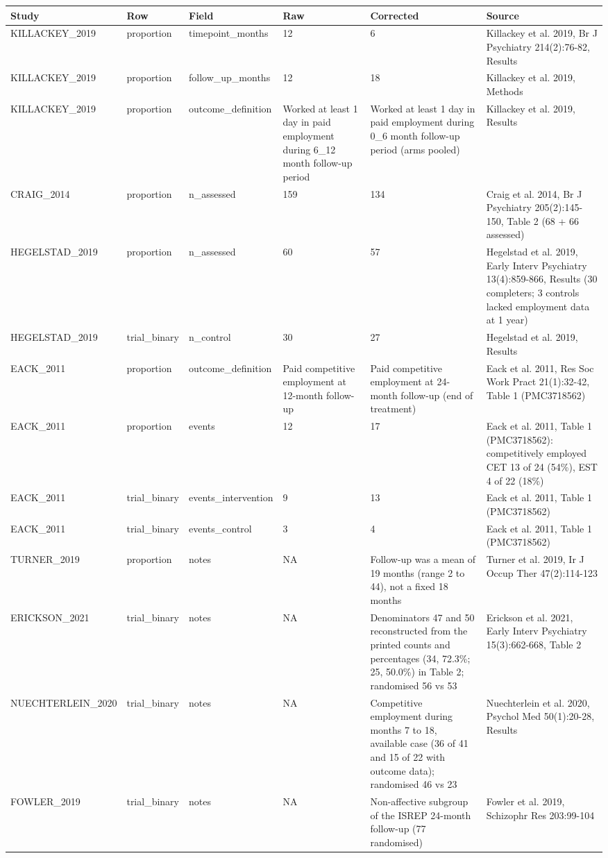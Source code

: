 
\begin{tabular}{lllp{3.2cm}p{5cm}p{6.5cm}}
\toprule
Study & Row & Field & Raw & Corrected & Source\\
\midrule
KILLACKEY\_2019 & proportion & timepoint\_months & 12 & 6 & Killackey et al. 2019, Br J Psychiatry 214(2):76-82, Results\\
KILLACKEY\_2019 & proportion & follow\_up\_months & 12 & 18 & Killackey et al. 2019, Methods\\
KILLACKEY\_2019 & proportion & outcome\_definition & Worked at least 1 day in paid employment during 6\_12 month follow-up period & Worked at least 1 day in paid employment during 0\_6 month follow-up period (arms pooled) & Killackey et al. 2019, Results\\
CRAIG\_2014 & proportion & n\_assessed & 159 & 134 & Craig et al. 2014, Br J Psychiatry 205(2):145-150, Table 2 (68 + 66 assessed)\\
HEGELSTAD\_2019 & proportion & n\_assessed & 60 & 57 & Hegelstad et al. 2019, Early Interv Psychiatry 13(4):859-866, Results (30 completers; 3 controls lacked employment data at 1 year)\\
HEGELSTAD\_2019 & trial\_binary & n\_control & 30 & 27 & Hegelstad et al. 2019, Results\\
EACK\_2011 & proportion & outcome\_definition & Paid competitive employment at 12-month follow-up & Paid competitive employment at 24-month follow-up (end of treatment) & Eack et al. 2011, Res Soc Work Pract 21(1):32-42, Table 1 (PMC3718562)\\
EACK\_2011 & proportion & events & 12 & 17 & Eack et al. 2011, Table 1 (PMC3718562): competitively employed CET 13 of 24 (54\%), EST 4 of 22 (18\%)\\
EACK\_2011 & trial\_binary & events\_intervention & 9 & 13 & Eack et al. 2011, Table 1 (PMC3718562)\\
EACK\_2011 & trial\_binary & events\_control & 3 & 4 & Eack et al. 2011, Table 1 (PMC3718562)\\
TURNER\_2019 & proportion & notes & NA & Follow-up was a mean of 19 months (range 2 to 44), not a fixed 18 months & Turner et al. 2019, Ir J Occup Ther 47(2):114-123\\
ERICKSON\_2021 & trial\_binary & notes & NA & Denominators 47 and 50 reconstructed from the printed counts and percentages (34, 72.3\%; 25, 50.0\%) in Table 2; randomised 56 vs 53 & Erickson et al. 2021, Early Interv Psychiatry 15(3):662-668, Table 2\\
NUECHTERLEIN\_2020 & trial\_binary & notes & NA & Competitive employment during months 7 to 18, available case (36 of 41 and 15 of 22 with outcome data); randomised 46 vs 23 & Nuechterlein et al. 2020, Psychol Med 50(1):20-28, Results\\
FOWLER\_2019 & trial\_binary & notes & NA & Non-affective subgroup of the ISREP 24-month follow-up (77 randomised) & Fowler et al. 2019, Schizophr Res 203:99-104\\
\bottomrule
\end{tabular}
